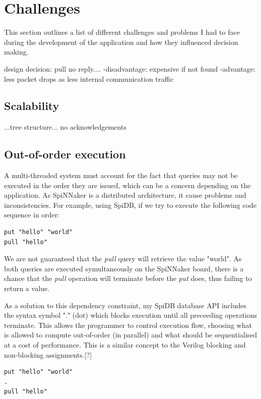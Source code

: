 \section{Challenges}
This section outlines a list of different challenges and problems I had to face during the development of the application and how they influenced decision making.


design decision: pull no reply....
-disadvantage: expensive if not found
-advantage: less packet drops as less internal communication traffic

\subsection{Scalability}
...tree structure...
no acknowledgements

\subsection{Out-of-order execution}
\label{sec:out-of-order}
A multi-threaded system must account for the fact that queries may not be executed in the order they are issued, which can be a concern depending on the application. As SpiNNaker is a distributed architecture, it cause problems and inconsistencies.
For example, using SpiDB, if we try to execute the following code sequence in order:\\
\begin{lstlisting}[caption={Non-blocking execution}, label=list:non-blocking]
put "hello" "world"
pull "hello"
\end{lstlisting}

We are not guaranteed that the \textit{pull} query will retrieve the value "world". As both queries are executed symultaneously on the SpiNNaker board, there is a chance that the \textit{pull} operation will terminate before the \textit{put} does, thus failing to return a value.

As a solution to this dependency constraint, my SpiDB database API includes the syntax symbol "." (dot) which blocks execution until all preceeding operations terminate. This allows the programmer to control execution flow, choosing what is allowed to compute out-of-order (in parallel) and what should be sequentialised at a cost of performance. This is a similar concept to the Verilog blocking and non-blocking assignments.[?]

\begin{lstlisting}[caption={Blocking execution}, label=list:blocking1]
put "hello" "world"
.
pull "hello"
\end{lstlisting}

